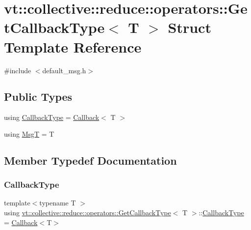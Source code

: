 \hypertarget{structvt_1_1collective_1_1reduce_1_1operators_1_1_get_callback_type_3_01_t_01_4}{}\section{vt\+:\+:collective\+:\+:reduce\+:\+:operators\+:\+:Get\+Callback\+Type$<$ T $>$ Struct Template Reference}
\label{structvt_1_1collective_1_1reduce_1_1operators_1_1_get_callback_type_3_01_t_01_4}


{\ttfamily \#include $<$default\+\_\+msg.\+h$>$}

\subsection*{Public Types}
\begin{DoxyCompactItemize}
\item 
using \hyperlink{structvt_1_1collective_1_1reduce_1_1operators_1_1_get_callback_type_3_01_t_01_4_a652af463a5627ab55299aa5fc9eb6f1b}{Callback\+Type} = \hyperlink{namespacevt_a57b238783d05de96bc2c4027f7073b7f}{Callback}$<$ T $>$
\item 
using \hyperlink{structvt_1_1collective_1_1reduce_1_1operators_1_1_get_callback_type_3_01_t_01_4_a84d837c46c05baf26b4b53a52320017d}{MsgT} = T
\end{DoxyCompactItemize}


\subsection{Member Typedef Documentation}
\mbox{\label{structvt_1_1collective_1_1reduce_1_1operators_1_1_get_callback_type_3_01_t_01_4_a652af463a5627ab55299aa5fc9eb6f1b}} 
\subsubsection{\texorpdfstring{Callback\+Type}{CallbackType}}
{\footnotesize\ttfamily template$<$typename T $>$ \\
using \hyperlink{structvt_1_1collective_1_1reduce_1_1operators_1_1_get_callback_type}{vt\+::collective\+::reduce\+::operators\+::\+Get\+Callback\+Type}$<$ T $>$\+::\hyperlink{structvt_1_1collective_1_1reduce_1_1operators_1_1_get_callback_type_3_01_t_01_4_a652af463a5627ab55299aa5fc9eb6f1b}{Callback\+Type} =  \hyperlink{namespacevt_a57b238783d05de96bc2c4027f7073b7f}{Callback}$<$T$>$}

